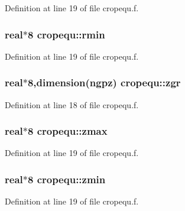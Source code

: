 Definition at line 19 of file cropequ.f.\hypertarget{namespacecropequ_cf78277c748724ebe92ec8527f5acc26}{
\subsubsection[rmin]{\setlength{\rightskip}{0pt plus 5cm}real$\ast$8 {\bf cropequ::rmin}}}
\label{namespacecropequ_cf78277c748724ebe92ec8527f5acc26}




Definition at line 19 of file cropequ.f.\hypertarget{namespacecropequ_ba94b950afefefed82de22487f2e6f95}{
\subsubsection[zgr]{\setlength{\rightskip}{0pt plus 5cm}real$\ast$8,dimension({\bf ngpz}) {\bf cropequ::zgr}}}
\label{namespacecropequ_ba94b950afefefed82de22487f2e6f95}




Definition at line 18 of file cropequ.f.\hypertarget{namespacecropequ_ad2308c1d9ad8704c10ca1a8a65a44c0}{
\subsubsection[zmax]{\setlength{\rightskip}{0pt plus 5cm}real$\ast$8 {\bf cropequ::zmax}}}
\label{namespacecropequ_ad2308c1d9ad8704c10ca1a8a65a44c0}




Definition at line 19 of file cropequ.f.\hypertarget{namespacecropequ_9a350ad968e30ba111940f451ea50702}{
\subsubsection[zmin]{\setlength{\rightskip}{0pt plus 5cm}real$\ast$8 {\bf cropequ::zmin}}}
\label{namespacecropequ_9a350ad968e30ba111940f451ea50702}




Definition at line 19 of file cropequ.f.